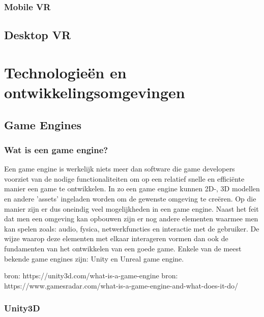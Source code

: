 \subsubsection{Mobile VR}


\subsection{Desktop VR}



\section{Technologieën en ontwikkelingsomgevingen}
\subsection{Game Engines}
\subsubsection{Wat is een game engine?}
Een game engine is werkelijk niets meer dan software die game developers voorziet van de nodige functionaliteiten om op een relatief snelle en efficiënte manier een game te ontwikkelen. In zo een game engine kunnen 2D-, 3D modellen en andere 'assets' ingeladen worden om de gewenste omgeving te creëren. Op die manier zijn er dus oneindig veel mogelijkheden in een game engine. Naast het feit dat men een omgeving kan opbouwen zijn er nog andere elementen waarmee men kan spelen zoals: audio, fysica, netwerkfuncties en interactie met de gebruiker. De wijze  waarop deze elementen met elkaar interageren vormen dan ook de fundamenten van het ontwikkelen van een goede game. Enkele van de meest bekende game engines zijn: Unity en Unreal game engine.
 

bron: https://unity3d.com/what-is-a-game-engine
bron: https://www.gamesradar.com/what-is-a-game-engine-and-what-does-it-do/

\subsubsection{Unity3D}

